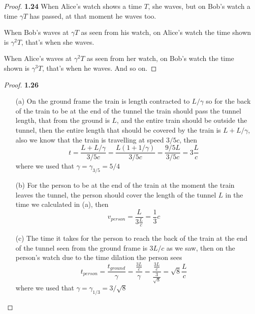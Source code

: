 \documentclass[11pt]{article}
\theoremstyle{definition}
\begin{document}
	\begin{proof}{\textbf{1.24}}
        When Alice's watch shows a time $T$, she waves, but on Bob's watch a
        time $\gamma T$ has passed, at that moment he waves too.

        When Bob's waves at $\gamma T$ as seen from his watch, on Alice's watch
        the time shown is $\gamma^2 T$, that's when she waves.

        When Alice's waves at $\gamma^2 T$ as seen from her watch, on Bob's
        watch the time shown is $\gamma^3 T$, that's when he waves.
        And so on.
    \end{proof}
\cleardoublepage
	\begin{proof}{\textbf{1.26}}
        \begin{itemize}
            \item [(a)] On the ground frame the train is length contracted to
            $L/\gamma$ so for the back of the train to be at the end of the
            tunnel the train should pass the tunnel length, that from the
            ground is $L$, and the entire train should be outside the tunnel,
            then the entire length that should be covered by the train is
            $L + L/\gamma$, also we know that the train is travelling at speed
            $3/5c$, then
            $$t = \frac{L + L/\gamma}{3/5c}
                = \frac{L(1 + 1/\gamma)}{3/5c}
                = \frac{9/5L}{3/5c}
                = 3\frac{L}{c}$$
            where we used that $\gamma = \gamma_{3/5} = 5/4$
            \item [(b)] For the person to be at the end of the train at the
            moment the train leaves the tunnel, the person should cover the
            length of the tunnel $L$ in the time we calculated in (a), then
            $$v_{person} = \frac{L}{3\frac{L}{c}} = \frac{1}{3}c$$
            \item [(c)] The time it takes for the person to reach the back of
            the train at the end of the tunnel seen from the ground frame is
            $3L/c$ as we saw, then on the person's watch due to
            the time dilation the person sees
            $$t_{person} = \frac{t_{ground}}{\gamma}
                = \frac{\frac{3L}{c}}{\gamma}
                = \frac{\frac{3L}{c}}{\frac{3}{\sqrt{8}}}
                = \sqrt{8}\frac{L}{c}$$   
            where we used that $\gamma = \gamma_{1/3} = 3/\sqrt{8}$
            \end{itemize}
    \end{proof}
\end{document}
